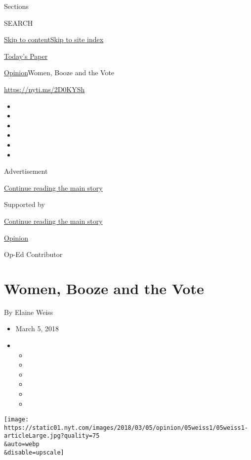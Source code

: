 Sections

SEARCH

\protect\hyperlink{site-content}{Skip to
content}\protect\hyperlink{site-index}{Skip to site index}

\href{https://myaccount.nytimes.com/auth/login?response_type=cookie\&client_id=vi}{}

\href{https://www.nytimes.com/section/todayspaper}{Today's Paper}

\href{/section/opinion}{Opinion}\textbar{}Women, Booze and the Vote

\url{https://nyti.ms/2D0KYSh}

\begin{itemize}
\item
\item
\item
\item
\item
\item
\end{itemize}

Advertisement

\protect\hyperlink{after-top}{Continue reading the main story}

Supported by

\protect\hyperlink{after-sponsor}{Continue reading the main story}

\href{/section/opinion}{Opinion}

Op-Ed Contributor

\hypertarget{women-booze-and-the-vote}{%
\section{Women, Booze and the Vote}\label{women-booze-and-the-vote}}

By Elaine Weiss

\begin{itemize}
\item
  March 5, 2018
\item
  \begin{itemize}
  \item
  \item
  \item
  \item
  \item
  \item
  \end{itemize}
\end{itemize}

\texttt{[image: https://static01.nyt.com/images/2018/03/05/opinion/05weiss1/05weiss1-articleLarge.jpg?quality=75\\\&auto=webp\\\&disable=upscale]}

